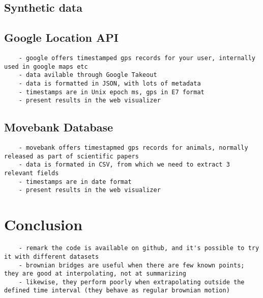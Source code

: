 \documentclass{article}
\begin{document}
\subsection{Synthetic data}



\subsection{Google Location API}

\begin{verbatim}
    - google offers timestamped gps records for your user, internally used in google maps etc
    - data avilable through Google Takeout
    - data is formatted in JSON, with lots of metadata
    - timestamps are in Unix epoch ms, gps in E7 format
    - present results in the web visualizer
\end{verbatim}

\subsection{Movebank Database}

\begin{verbatim}
    - movebank offers timestapmed gps records for animals, normally released as part of scientific papers
    - data is formated in CSV, from which we need to extract 3 relevant fields
    - timestamps are in date format
    - present results in the web visualizer
\end{verbatim}

\section{Conclusion}

\begin{verbatim}
    - remark the code is available on github, and it's possible to try it with different datasets
    - brownian bridges are useful when there are few known points; they are good at interpolating, not at summarizing
    - likewise, they perform poorly when extrapolating outside the defined time interval (they behave as regular brownian motion)
\end{verbatim}
\end{document}
